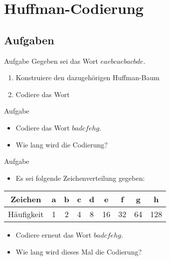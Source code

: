 \section{Huffman-Codierung}
\subsection{Aufgaben}
\begin{frame}
	\begin{block}{Aufgabe}
		Gegeben sei das Wort $eaebcaebacbde$.
		\begin{enumerate}
			\item Konstruiere den dazugehörigen Huffman-Baum
			\item Codiere das Wort
		\end{enumerate}
	\end{block}
\end{frame}

\begin{frame}
	\begin{block}{Aufgabe}
		\begin{itemize}
			\item Codiere das Wort $badcfehg$.
			\item Wie lang wird die Codierung?
		\end{itemize}
	\end{block}
	\begin{block}{Aufgabe}
		\begin{itemize}
			\item Es sei folgende Zeichenverteilung gegeben:
		\end{itemize}
			\begin{tabular}{ccccccccc}
				\toprule
				Zeichen&a&b&c&d&e&f&g&h\\
				\midrule
				Häufigkeit&1&2&4&8&16&32&64&128\\
				\bottomrule
			\end{tabular}
		\begin{itemize}
			\item Codiere erneut das Wort $badcfehg$.
			\item Wie lang wird dieses Mal die Codierung?
		\end{itemize}
	\end{block}
\end{frame}

